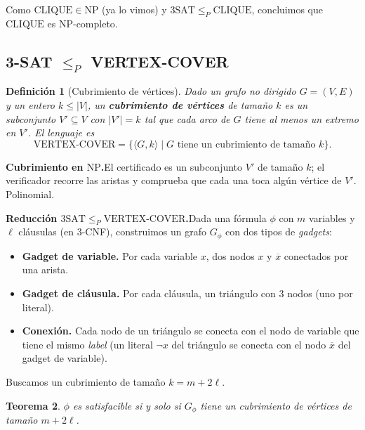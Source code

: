 \documentclass[11pt,a4paper]{article}
\theoremstyle{definicion}
\newtheorem{definicion}{Definición}[section]
\newtheorem{teorema}[definicion]{Teorema}
\newcommand{\enc}[1]{\langle #1 \rangle}
\newcommand{\redP}{\leq_{P}}
\newcommand{\NP}{\mathrm{NP}}
\begin{document}
\begin{idea}
Como $\mathrm{CLIQUE} \in \NP$ (ya lo vimos) y $3\mathrm{SAT} \redP \mathrm{CLIQUE}$, concluimos que $\mathrm{CLIQUE}$ es NP-completo.
\end{idea}

\subsection{3-SAT $\redP$ VERTEX-COVER}

\begin{definicion}[Cubrimiento de vértices]
Dado un grafo no dirigido $G = (V, E)$ y un entero $k \leq |V|$, un \textbf{cubrimiento de vértices} de tamaño $k$ es un subconjunto $V' \subseteq V$ con $|V'| = k$ tal que cada arco de $G$ tiene al menos un extremo en $V'$. El lenguaje es
\[
\mathrm{VERTEX\text{-}COVER} = \{ \enc{G, k} \mid G \text{ tiene un cubrimiento de tamaño } k\}.
\]
\end{definicion}

\textbf{Cubrimiento en $\NP$.}\quad El certificado es un subconjunto $V'$ de tamaño $k$; el verificador recorre las aristas y comprueba que cada una toca algún vértice de $V'$. Polinomial.

\textbf{Reducción $3\mathrm{SAT} \redP \mathrm{VERTEX\text{-}COVER}$.}\quad Dada una fórmula $\phi$ con $m$ variables y $\ell$ cláusulas (en 3-CNF), construimos un grafo $G_\phi$ con dos tipos de \emph{gadgets}:

\begin{itemize}
    \item \textbf{Gadget de variable.} Por cada variable $x$, dos nodos $x$ y $\overline{x}$ conectados por una arista.
    \item \textbf{Gadget de cláusula.} Por cada cláusula, un triángulo con 3 nodos (uno por literal).
    \item \textbf{Conexión.} Cada nodo de un triángulo se conecta con el nodo de variable que tiene el mismo \emph{label} (un literal $\neg x$ del triángulo se conecta con el nodo $\overline{x}$ del gadget de variable).
\end{itemize}

Buscamos un cubrimiento de tamaño $k = m + 2\ell$.

\begin{teorema}
$\phi$ es satisfacible si y solo si $G_\phi$ tiene un cubrimiento de vértices de tamaño $m + 2\ell$.
\end{teorema}
\end{document}
